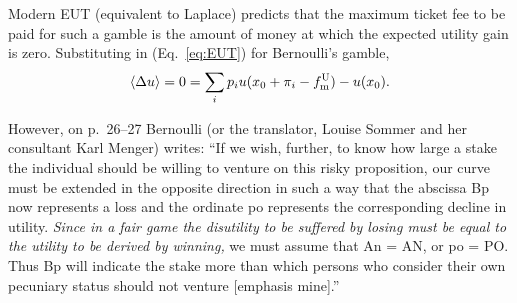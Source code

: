 \documentclass[pdftex]{article}
\newcommand{\ave}[1]{\left\langle#1 \right\rangle}
\newcommand{\elabel}[1]{\label{eq:#1}}
\newcommand{\eref}[1]{(Eq.~\ref{eq:#1})}
\newcommand{\be}{\begin{equation}}
\newcommand{\ee}{\end{equation}}
\newcommand{\Du}{\Delta u}
\newcommand{\tml}{{f_{\text{\normalfont{m}}}^{\text{\normalfont{U}}}}}
\begin{document}
Modern EUT (equivalent to Laplace) predicts that the maximum ticket fee to be paid for such a gamble is the amount of money at which the expected utility gain is zero. Substituting in \eref{EUT} for Bernoulli's gamble,
\be
\ave{\Du}=0=\sum_i p_i u(x_0+\pi_i-\tml) - u(x_0).
\elabel{EUT_B}
\ee

However, on p.~26--27 Bernoulli (or the translator, Louise Sommer and her consultant Karl Menger) writes:
``If we wish, further, to know how large a stake the individual should be willing to venture on this risky proposition, our curve must be extended in the opposite direction in such a way that the abscissa Bp now represents a loss and the ordinate po represents the corresponding decline in utility. {\it Since in a fair game the disutility to be suffered by losing must be equal to the utility to be derived by winning,} we must assume that An = AN, or po = PO. Thus Bp will indicate the stake more than which persons who consider their own pecuniary status should not venture [emphasis mine].''
\end{document}
